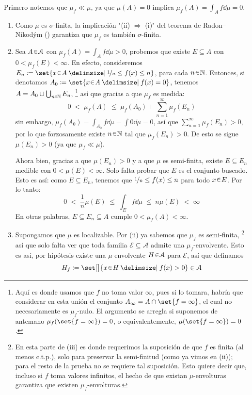 \begin{sol}
Primero notemos que $\mu_f \ll \mu $, ya que $\mu(A) =0 $ implica $\mu_f(A) = \int_A f\dd{\mu} = 0$.
\begin{enumerate}[label = (\roman*), leftmargin=1.8em]
\item 
Como $\mu$ es $\sigma$-finita, la implicación "(ii) $\Rightarrow$ (i)" del teorema de Radon–Nikodým (\cite[teorema 5.4]{Salamon}) garantiza que $\mu_f$ es también $\sigma$-finita.
\item
Sea $A\en\mathcal{A}$ con $\mu_f(A) = \int_Af\dd{\mu} > 0$, probemos que existe $E\subseteq A$ con $0 < \mu_f(E) < \infty$. En efecto, consideremos $E_n \coloneq \set{x\en A \given \nicefrac{1}{n} \leq f(x) \leq n}$, para cada $n\en\mathbb{N}$. Entonces, si denotamos $A_{0} \coloneq \set{x\en A \given f(x)=0}$, tenemos $A  = A_0 \cup \bigcup_{n\en\mathbb{N}}E_n$,%
\footnote{
    Aquí es donde usamos que $f$ no toma valor $\infty$, pues si lo tomara, habría que considerar en esta unión el conjunto $A_\infty = A \cap\set{f=\infty}$, el cual no necesariamente es $\mu_f$-nulo. El argumento se arregla si suponemos de antemano $\mu_f(\set{f=\infty}) = 0$, o equivalentemente, $\mu(\set{f=\infty})=0$.
}
así que gracias a que $\mu_f$ es medida:
\[
0 
\;<\; \mu_f(A)
\;\leq\; \mu_f(A_0) + \sum^\infty_{n=1}\mu_f(E_n) 
\]
sin embargo, $\mu_f(A_0) = \int_{A_0} f\dd{\mu} = \int0\dd{\mu}=0$, así que $\sum^\infty_{n=1}\mu_f(E_n) >0$, por lo que forzosamente existe $n\en\mathbb{N}$ tal que $\mu_f(E_n)>0$. De esto se sigue $\mu(E_n) >0$ (ya que $\mu_f \ll\mu$).\par
Ahora bien, gracias a que $\mu(E_n)>0$ y a que $\mu$ es semi-finita, existe $E\subseteq E_n$ medible con $0 < \mu(E) < \infty$. Solo falta probar que $E$ es el conjunto buscado.
Esto es así: como $E\subseteq E_n$, tenemos que $\nicefrac{1}{n} \leq f(x) \leq n$ para todo $x\en E$. Por lo tanto:
\[
0 
\;<\;\frac{1}{n}\mu(E)
\;\leq\; \int_E f \dd{\mu} 
\;\leq\; n\mu(E) 
\;<\; \infty
\]
En otras palabras, $E\subseteq E_n \subseteq A$ cumple $0<\mu_f(A) < \infty$.
\item 
Supongamos que $\mu$ es localizable. Por (ii) ya sabemos que $\mu_f$ es semi-finita,%
\footnote{
    En esta parte de (iii) es donde requerimos la suposición de que $f$ es finita (al menos c.t.p.), solo para preservar la semi-finitud (como ya vimos en (ii)); para el resto de la prueba no se requiere tal suposición. Esto quiere decir que, incluso si $f$ toma valores infinitos, el hecho de que existan $\mu$-envolturas garantiza que existen $\mu_f$-envolturas.
}
así que solo falta ver que toda familia $\mathcal{E} \subseteq \mathcal{A}$ admite una $\mu_f$-envolvente.
Esto es así, por hipótesis existe una $\mu$-envolvente $H\en\mathcal{A}$ para $\mathcal{E}$, así que definamos
\[
H_f \coloneq \set[\big]{x\en H \given f(x)>0} \in \mathcal{A}
\]


\end{enumerate}
\end{sol}
